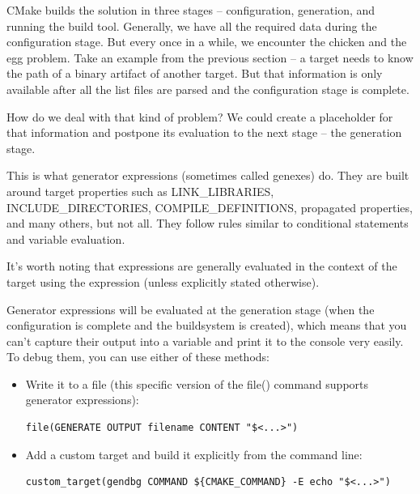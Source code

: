 
CMake builds the solution in three stages – configuration, generation, and running the build tool. Generally, we have all the required data during the configuration stage. But every once in a while, we encounter the chicken and the egg problem. Take an example from the previous section – a target needs to know the path of a binary artifact of another target. But that information is only available after all the list files are parsed and the configuration stage is complete.

How do we deal with that kind of problem? We could create a placeholder for that information and postpone its evaluation to the next stage – the generation stage.

This is what generator expressions (sometimes called genexes) do. They are built around target properties such as LINK\_LIBRARIES, INCLUDE\_DIRECTORIES, COMPILE\_DEFINITIONS, propagated properties, and many others, but not all. They follow rules similar to conditional statements and variable evaluation.

It's worth noting that expressions are generally evaluated in the context of the target using the expression (unless explicitly stated otherwise).

\begin{tcolorbox}[colback=blue!5!white,colframe=blue!75!black,title=Important Note]
Generator expressions will be evaluated at the generation stage (when the configuration is complete and the buildsystem is created), which means that you can't capture their output into a variable and print it to the console very easily. To debug them, you can use either of these methods: 

\begin{itemize}
\item 
Write it to a file (this specific version of the file() command supports generator expressions): \begin{lstlisting}[style=styleCMake]
file(GENERATE OUTPUT filename CONTENT "$<...>")
\end{lstlisting}

\item 
Add a custom target and build it explicitly from the command line: 
\begin{lstlisting}[style=styleCMake]
custom_target(gendbg COMMAND ${CMAKE_COMMAND} -E echo "$<...>")
\end{lstlisting}
\end{itemize}
\end{tcolorbox}

